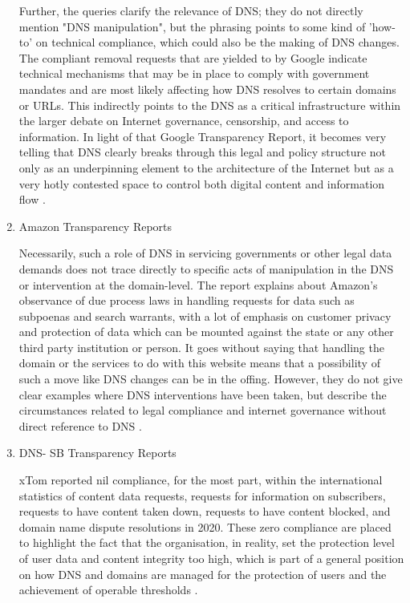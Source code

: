 \begin{enumerate}
Further, the queries clarify the relevance of DNS; they do not directly mention "DNS manipulation", but the phrasing points to some kind of 'how-to' on technical compliance, which could also be the making of DNS changes. The compliant removal requests that are yielded to by Google indicate technical mechanisms that may be in place to comply with government mandates and are most likely affecting how DNS resolves to certain domains or URLs. This indirectly points to the DNS as a critical infrastructure within the larger debate on Internet governance, censorship, and access to information. In light of that Google Transparency Report, it becomes very telling that DNS clearly breaks through this legal and policy structure not only as an underpinning element to the architecture of the Internet but as a very hotly contested space to control both digital content and information flow \cite{Google2023}.

\item Amazon Transparency Reports 

Necessarily, such a role of DNS in servicing governments or other legal data demands does not trace directly to specific acts of manipulation in the DNS or intervention at the domain-level. The report explains about Amazon's observance of due process laws in handling requests for data such as subpoenas and search warrants, with a lot of emphasis on customer privacy and protection of data which can be mounted against the state or any other third party institution or person. It goes without saying that handling the domain or the services to do with this website means that a possibility of such a move like DNS changes can be in the offing. However, they do not give clear examples where DNS interventions have been taken, but describe the circumstances related to legal compliance and internet governance without direct reference to DNS \cite{Amazon2023}.

\item DNS- SB  Transparency Reports

xTom reported nil compliance, for the most part, within the international statistics of content data requests, requests for information on subscribers, requests to have content taken down, requests to have content blocked, and domain name dispute resolutions in 2020. These zero compliance are placed to highlight the fact that the organisation, in reality, set the protection level of user data and content integrity too high, which is part of a general position on how DNS and domains are managed for the protection of users and the achievement of operable thresholds \cite{DNSSB2023}.


\end{enumerate}
